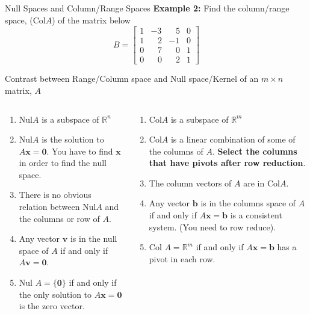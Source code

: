 \documentclass[10pt, aspectratio=169]{beamer}
\begin{document}
\begin{frame}{Null Spaces and Column/Range Spaces}
{    \textbf{Example 2:} Find the column/range space, (Col\(A\)) of the matrix below
    \[
    B = \begin{bmatrix}
        1 & -3 & \;\;\;5 & 0\\
        1 & \;\;\;2 & -1 & 0\\
        0 & \;\;\;7 & \;\;\;0 & 1 \\
        0 & \;\;\;0 & \;\;\;2 &  1
    \end{bmatrix}
    \]
    }
\end{frame}


\begin{frame}{Contrast between Range/Column space and Null space/Kernel of an \(m\times n\) matrix, \(A\)}
\begin{columns}
    \begin{column}{0.5\textwidth}
        \begin{enumerate}
            \item Nul\(A\) is a subspace of \(\mathbb{R}^n\)
            \item Nul\(A\) is the solution to \(A\mathbf{x}=\mathbf{0}\). You have to find \(\mathbf{x}\) in order to find the null space.
            \item There is no obvious relation between Nul\(A\) and the columns or row of \(A\).
            \item Any vector \(\mathbf{v}\) is in the null space of \(A\) if and only if \(A\mathbf{v}=\mathbf{0}\).
            \item Nul \(A=\{\mathbf{0}\}\) if and only if the only solution to \(A\mathbf{x}=\mathbf{0}\) is the zero vector.
        \end{enumerate}
    \end{column}
    \begin{column}{0.5\textwidth}
        \begin{enumerate}
            \item Col\(A\) is a subspace of \(\mathbb{R}^m\)
            \item Col\(A\) is a linear combination of some of the columns of \(A\). \textbf{Select the columns that have pivots after row reduction}.
            \item The column vectors of \(A\) are in Col\(A\).
            \item Any vector \(\mathbf{b}\) is in the columns space of \(A\) if and only if \(A\mathbf{x}=\mathbf{b}\) is a consistent system. (You need to row reduce).
            \item Col \(A=\mathbb{R}^m\) if and only if \(A\mathbf{x}=\mathbf{b}\) has a pivot in each row.
        \end{enumerate}
    \end{column}
\end{columns}
\end{frame}
\end{document}
